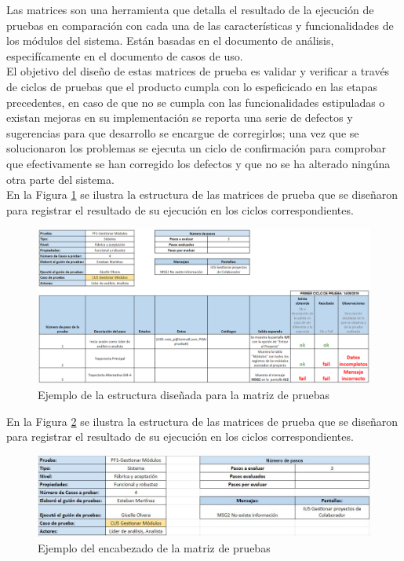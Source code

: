 Las matrices son una herramienta que detalla el resultado de la ejecución de pruebas en comparación con cada una de las características y funcionalidades de los módulos del sistema. Están basadas en el documento de análisis, especifícamente en el documento de casos de uso.\\

El objetivo del diseño de estas matrices de prueba es validar y verificar a través de ciclos de pruebas que el producto cumpla con lo espeficicado en las etapas precedentes, en caso de que no se cumpla con las funcionalidades estipuladas o existan mejoras en su implementación se reporta una serie de defectos y sugerencias para que desarrollo se encargue de corregirlos; una vez que se solucionaron los problemas se ejecuta un ciclo de confirmación para comprobar que efectivamente se han corregido los defectos y que no se ha alterado ningúna otra parte del sistema.\\

En la Figura \ref{fig:estructurap} se ilustra la estructura de las matrices de prueba que se diseñaron para registrar el resultado de su ejecución en los ciclos correspondientes.

\begin{figure}[H]
	\begin{center}
		\includegraphics[width=.99\textwidth]{images/pruebas/diseno/estructurap}
		\caption{Ejemplo de la estructura diseñada para la matriz de pruebas}
		\label{fig:estructurap}
	\end{center}
\end{figure}

En la Figura \ref{fig:encabezado} se ilustra la estructura de las matrices de prueba que se diseñaron para registrar el resultado de su ejecución en los ciclos correspondientes.

\begin{figure}[H]
	\begin{center}
		\includegraphics[width=.95\textwidth]{images/pruebas/diseno/encabezado}
		\caption{Ejemplo del encabezado de la matriz de pruebas}
		\label{fig:encabezado}
	\end{center}
\end{figure}

